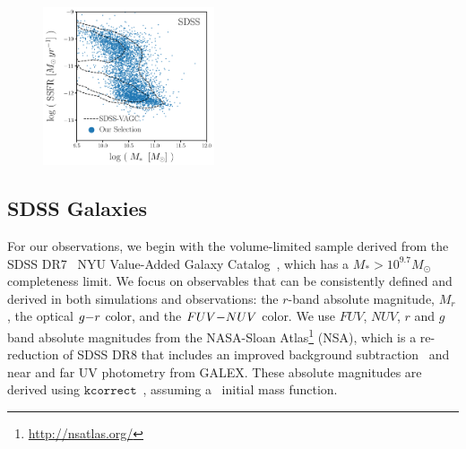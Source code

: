 \begin{figure}
\begin{center}
    \includegraphics[width=0.45\textwidth]{figs/sdss_selection.pdf} 
    \caption{\label{fig:sdss_sel}
    }
\end{center}
\end{figure}


\subsection{SDSS Galaxies} \label{sec:obs} 
For our observations, we 
begin with the volume-limited \cite{tinker2011} sample derived from the SDSS
DR7~\citep{abazajian2009} NYU Value-Added Galaxy
Catalog~\citep[VAGC;][]{blanton2005}, which has a $M_* > 10^{9.7} M_\odot$
completeness limit. 
We focus on observables that can be consistently defined and derived in both simulations 
and observations: the $r$-band absolute magnitude, $M_r$, the optical $g{-}r$
color, and the $FUV{-}NUV$ color. 
We use $FUV$, $NUV$, $r$ and $g$ band absolute magnitudes from the NASA-Sloan
Atlas\footnote{\url{http://nsatlas.org/}} (NSA), which is a re-reduction of SDSS DR8
\citep{aihara2011} that includes an improved background subtraction~\citep{blanton2011} 
and near and far UV photometry from GALEX. These absolute magnitudes are
derived using $\mathtt{kcorrect}$~\citep{blanton2007a}, assuming
a~\cite{chabrier2003} initial mass function. 

